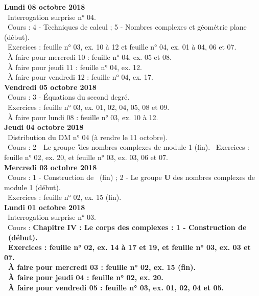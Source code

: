 \documentclass[12pt,a4paper]{article}
\begin{document}
\noindent\textbf{\bf Lundi 08 octobre 2018}\\
\bu\ Interrogation surprise n° 04.\\ 
\bu\ Cours : 4 - Techniques de calcul ; 5 - Nombres complexes et géométrie plane (début).\\
\bu\ Exercices : feuille n° 03, ex. 10 à 12 et feuille n° 04, ex. 01 à 04, 06 et 07.\\
\bu\ À faire pour mercredi 10 : feuille n° 04, ex. 05 et 08.\\
\bu\ À faire pour jeudi 11 : feuille n° 04, ex. 12.\\
\bu\ À faire pour vendredi 12 : feuille n° 04, ex. 17.\vspace{.4cm}\\
 
\noindent\textbf{Vendredi 05 octobre 2018}\\
\bu\ Cours : 3 - Équations du second degré.\\
\bu\ Exercices : feuille n° 03, ex. 01, 02, 04, 05, 08 et 09.\\
\bu\ À faire pour lundi 08 : feuille n° 03, ex. 10 à 12.\vspace{.4cm}\\
% 
\noindent\textbf{Jeudi 04 octobre 2018}\\
\bu\ Distribution du DM n° 04 (à rendre le 11 octobre).\\
\bu\ Cours : 2 - Le groupe \U\ des nombres complexes de module 1 (fin).
\bu\ Exercices : feuille n° 02, ex. 20, et feuille n° 03, ex. 03, 06 et 07.\vspace{.4cm}\\

\noindent\textbf{\bf Mercredi 03 octobre 2018}\\
\bu\ Cours : 1 - Construction de \C\ (fin) ; 2 - Le groupe \textbf{U} des nombres 
complexes de module 1 (début).\\
\bu\ Exercices : feuille n° 02, ex. 15 (fin).\vspace{.4cm}\\

\noindent\textbf{\bf Lundi 01 octobre 2018}\\
\bu\ Interrogation surprise n° 03.\\
\bu\ Cours : \bf Chapitre IV \rm : Le corps des complexes : 1 - Construction de \C\ (début).\\
\bu\ Exercices : feuille n° 02, ex. 14 à 17 et 19, et feuille n° 03, ex. 03 et 07.\\
\bu\ À faire pour mercredi 03 : feuille n° 02, ex. 15 (fin).\\
\bu\ À faire pour jeudi 04 : feuille n° 02, ex. 20.\\
\bu\ À faire pour vendredi 05 : feuille n° 03, ex. 01, 02, 04 et 05.\vspace{.4cm}\\ 
\end{document}
